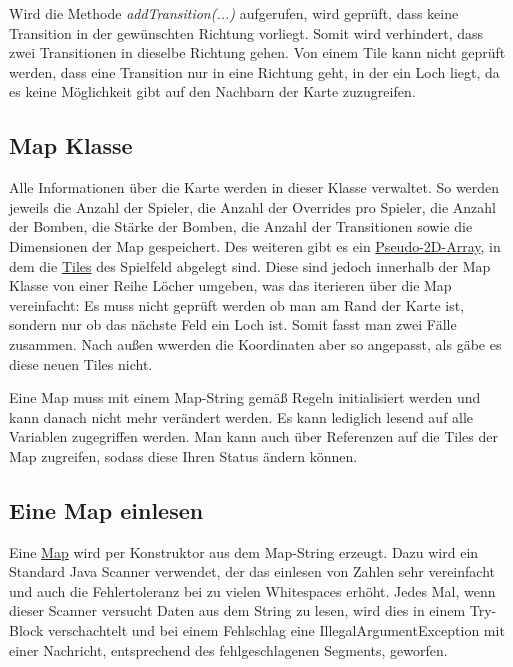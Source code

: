 Wird die Methode \textit{addTransition(...)} aufgerufen, wird geprüft, dass keine Transition in der gewünschten Richtung vorliegt. Somit wird verhindert, dass zwei Transitionen in dieselbe Richtung gehen. Von einem Tile kann nicht geprüft werden, dass eine Transition nur in eine Richtung geht, in der ein Loch liegt, da es keine Möglichkeit gibt auf den Nachbarn der Karte zuzugreifen.
\subsection{Map Klasse}
\label{subsuec:Map}
Alle Informationen über die Karte werden in dieser Klasse verwaltet. So werden jeweils die Anzahl der Spieler, die Anzahl der Overrides pro Spieler, die Anzahl der Bomben, die Stärke der Bomben, die Anzahl der Transitionen sowie die Dimensionen der Map gespeichert. Des weiteren gibt es ein \hyperref[subsec:PseudeArr]{Pseudo-2D-Array}, in dem die \hyperref[subsec:Tile]{Tiles} des Spielfeld abgelegt sind. Diese sind jedoch innerhalb der Map Klasse von einer Reihe Löcher umgeben, was das iterieren über die Map vereinfacht: Es muss nicht geprüft werden ob man am Rand der Karte ist, sondern nur ob das nächste Feld ein Loch ist. Somit fasst man zwei Fälle zusammen. Nach außen wwerden die Koordinaten aber so angepasst, als gäbe es diese neuen Tiles nicht.

Eine Map muss mit einem Map-String gemäß Regeln initialisiert werden und kann danach nicht mehr verändert werden. Es kann lediglich lesend auf alle Variablen zugegriffen werden. Man kann auch über Referenzen auf die Tiles der Map zugreifen, sodass diese Ihren Status ändern können.
\subsection{Eine Map einlesen}
Eine \hyperref[subsec:Map]{Map} wird per Konstruktor aus dem Map-String erzeugt. Dazu wird ein Standard Java Scanner verwendet, der das einlesen von Zahlen sehr vereinfacht und auch die Fehlertoleranz bei zu vielen Whitespaces erhöht. Jedes Mal, wenn dieser Scanner versucht Daten aus dem String zu lesen, wird dies in einem Try-Block verschachtelt und bei einem Fehlschlag eine IllegalArgumentException mit einer Nachricht, entsprechend des fehlgeschlagenen Segments, geworfen.

